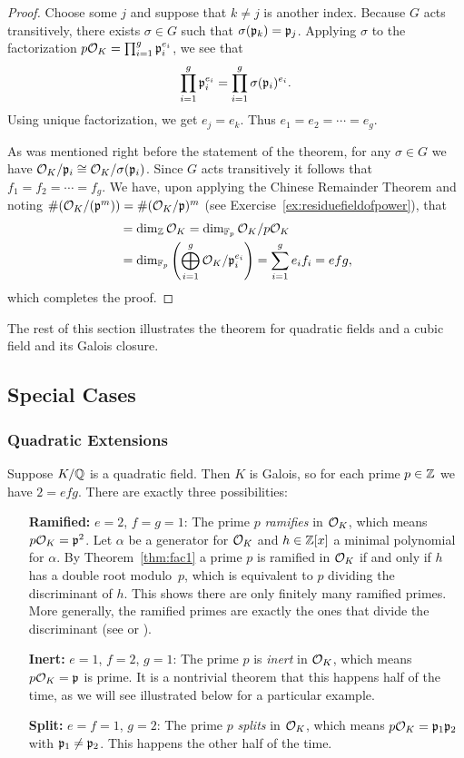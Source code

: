 \begin{proof}
Choose some $j$ and suppose that $k\neq j$ is another index.  Because
$G$ acts transitively, there exists $\sigma\in G$ such that
$\sigma(\mathfrak{p}_k)=\mathfrak{p}_j$.  Applying $\sigma$ to the factorization $p\mathcal{O}_K =
\prod_{i=1}^g \mathfrak{p}_i^{e_i}$, we see that
$$\prod_{i=1}^g \mathfrak{p}_i^{e_i} = \prod_{i=1}^g \sigma(\mathfrak{p}_i)^{e_i}.$$
Using unique factorization,
we get $e_j = e_k$.  Thus $e_1=e_2=\cdots = e_g$.

As was mentioned right before the statement of the theorem,  for any $\sigma\in G$
we have $\mathcal{O}_K/\mathfrak{p}_i\cong \mathcal{O}_K/\sigma(\mathfrak{p}_i)$. Since $G$ acts transitively
it follows that $f_1=f_2=\cdots = f_g$.
We have, upon applying the Chinese Remainder Theorem
and noting $\#(\mathcal{O}_K/(\mathfrak{p}^m)) = \#(\mathcal{O}_K/\mathfrak{p})^m$
(see Exercise~\ref{ex:residuefieldofpower}), that
\begin{align*}
[K:\Q]&= \dim_{\Z} \O_K = \dim_{\F_p} \O_K/p\O_K\\
    &= \dim_{\F_p} \left(\bigoplus_{i=1}^g \O_K/\p_i^{e_i}\right)
    = \sum_{i=1}^g e_i f_i
    = efg,
\end{align*}
which completes the proof.
\end{proof}

The rest of this section illustrates the theorem for quadratic fields
and a cubic field and its Galois closure.

\subsection{Special Cases}

\subsubsection*{Quadratic Extensions}

Suppose $K/\mathbb{Q}$ is a quadratic field.  Then $K$ is Galois, so for each prime $p\in\mathbb{Z}$ we have
$2=efg$. There are exactly three possibilities:
\begin{itemize}
\item[\bf{Ramified:}] $e=2$, $f=g=1$: The prime $p$ \emph{ramifies} in
$\mathcal{O}_K$, which means $p\mathcal{O}_K = \mathfrak{p}^2$.  Let $\alpha$ be a generator for $\mathcal{O}_K$ and
$h\in\mathbb{Z}[x]$ a minimal polynomial for $\alpha$.
By Theorem~\ref{thm:fac1} a prime $p$ is ramified in $\mathcal{O}_K$ if and only if
$h$ has a double root modulo~$p$, which is equivalent to $p$ dividing
the discriminant of $h$. This shows there are only finitely many ramified
primes. More generally, the ramified primes are exactly the
ones that divide the discriminant (see \cite[Thm.~24]{marcus1977number}
or
\cite[Cor.~III.2.12]{neukirch1999}).

\item[\bf{Inert}:] $e=1$, $f=2$, $g=1$: The prime $p$ is \emph{inert} in $\mathcal{O}_K$,
which means $p\mathcal{O}_K = \mathfrak{p}$ is prime.  It is a nontrivial theorem that
this happens half of the time,
as we will see illustrated below for a particular example.

\item[\bf{Split:}] $e=f=1$, $g=2$: The prime $p$ \emph{splits} in $\mathcal{O}_K$,
which means $p\mathcal{O}_K = \mathfrak{p}_1\mathfrak{p}_2$ with $\mathfrak{p}_1\neq \mathfrak{p}_2$.  This happens the other
half of the time.
\end{itemize}

